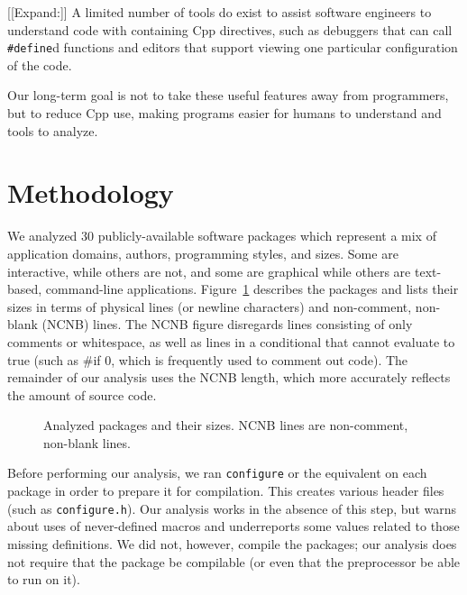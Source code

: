 \documentclass[10pt]{article}
\def\numpackages{30}
\newcommand{\file}[1]{\texttt{#1}}
\begin{document}

[[Expand:]]
A limited number of tools do exist to assist software engineers to
understand code with containing Cpp directives, such as debuggers that can
call {\tt \#define}d functions and editors that support viewing one
particular configuration of the code.

Our long-term goal is not to take these useful features away from
programmers, but to reduce Cpp use, making programs easier for humans to
understand and tools to analyze.






\section{Methodology}
\label{sec:methodology}

We analyzed {\numpackages} publicly-available software packages which
represent a mix of application domains, authors, programming styles, and
sizes.  Some are interactive, while others are not, and some are graphical
while others are text-based, command-line applications.
Figure~\ref{fig:packages} describes the packages and lists their sizes in
terms of physical lines (or newline characters) and non-comment, non-blank
(NCNB) lines.  The NCNB figure disregards lines consisting of only comments
or whitespace, as well as lines in a conditional that cannot evaluate to
true (such as {\#if 0}, which is frequently used to comment out code).  The
remainder of our analysis uses the NCNB length, which more accurately
reflects the amount of source code.

\begin{figure}
\centering
{%
  \setlength{\tabcolsep}{.25em}
  
}
\caption{Analyzed packages and their sizes.  NCNB lines are non-comment,
  non-blank lines.}
\label{fig:packages}
\end{figure}

Before performing our analysis, we ran {\tt configure} or the equivalent on
each package in order to prepare it for compilation.  This creates various
header files (such as \file{configure.h}).  Our analysis works in the
absence of this step, but warns about uses of never-defined macros and
underreports some values related to those missing definitions.  We did
not, however, compile the packages; our analysis does not require that the
package be compilable (or even that the preprocessor be able to run on it).
\end{document}
